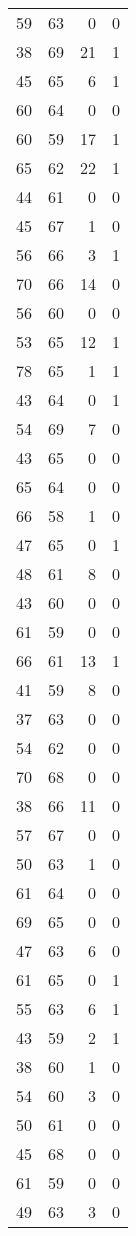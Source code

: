 \begin{tabular}{rrrr}
 59 &  63 &  0 &  0 \\
 38 &  69 & 21 &  1 \\
 45 &  65 &  6 &  1 \\
 60 &  64 &  0 &  0 \\
 60 &  59 & 17 &  1 \\
 65 &  62 & 22 &  1 \\
 44 &  61 &  0 &  0 \\
 45 &  67 &  1 &  0 \\
 56 &  66 &  3 &  1 \\
 70 &  66 & 14 &  0 \\
 56 &  60 &  0 &  0 \\
 53 &  65 & 12 &  1 \\
 78 &  65 &  1 &  1 \\
 43 &  64 &  0 &  1 \\
 54 &  69 &  7 &  0 \\
 43 &  65 &  0 &  0 \\
 65 &  64 &  0 &  0 \\
 66 &  58 &  1 &  0 \\
 47 &  65 &  0 &  1 \\
 48 &  61 &  8 &  0 \\
 43 &  60 &  0 &  0 \\
 61 &  59 &  0 &  0 \\
 66 &  61 & 13 &  1 \\
 41 &  59 &  8 &  0 \\
 37 &  63 &  0 &  0 \\
 54 &  62 &  0 &  0 \\
 70 &  68 &  0 &  0 \\
 38 &  66 & 11 &  0 \\
 57 &  67 &  0 &  0 \\
 50 &  63 &  1 &  0 \\
 61 &  64 &  0 &  0 \\
 69 &  65 &  0 &  0 \\
 47 &  63 &  6 &  0 \\
 61 &  65 &  0 &  1 \\
 55 &  63 &  6 &  1 \\
 43 &  59 &  2 &  1 \\
 38 &  60 &  1 &  0 \\
 54 &  60 &  3 &  0 \\
 50 &  61 &  0 &  0 \\
 45 &  68 &  0 &  0 \\
 61 &  59 &  0 &  0 \\
 49 &  63 &  3 &  0 \\

\end{tabular}
